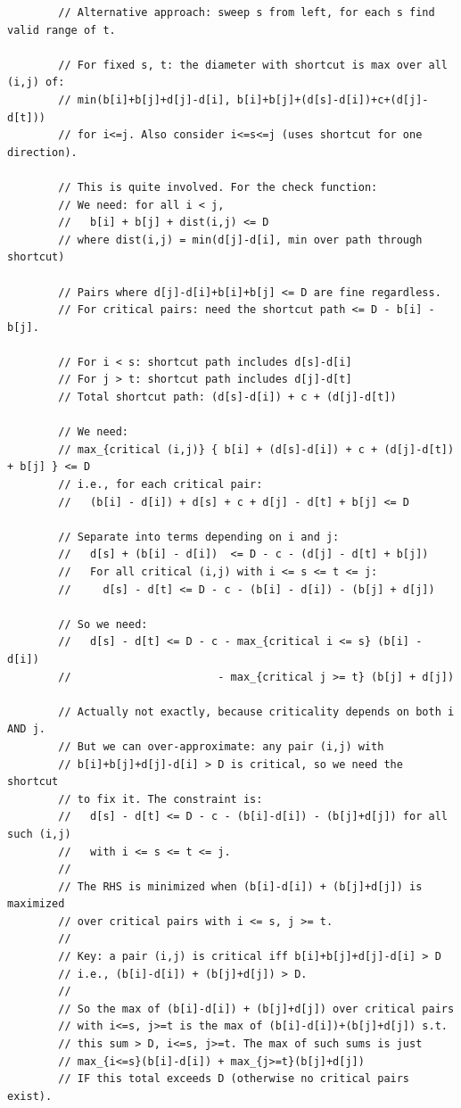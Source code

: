 \documentclass[11pt,a4paper]{article}
\begin{document}
\begin{lstlisting}
        // Alternative approach: sweep s from left, for each s find valid range of t.

        // For fixed s, t: the diameter with shortcut is max over all (i,j) of:
        // min(b[i]+b[j]+d[j]-d[i], b[i]+b[j]+(d[s]-d[i])+c+(d[j]-d[t]))
        // for i<=j. Also consider i<=s<=j (uses shortcut for one direction).

        // This is quite involved. For the check function:
        // We need: for all i < j,
        //   b[i] + b[j] + dist(i,j) <= D
        // where dist(i,j) = min(d[j]-d[i], min over path through shortcut)

        // Pairs where d[j]-d[i]+b[i]+b[j] <= D are fine regardless.
        // For critical pairs: need the shortcut path <= D - b[i] - b[j].

        // For i < s: shortcut path includes d[s]-d[i]
        // For j > t: shortcut path includes d[j]-d[t]
        // Total shortcut path: (d[s]-d[i]) + c + (d[j]-d[t])

        // We need:
        // max_{critical (i,j)} { b[i] + (d[s]-d[i]) + c + (d[j]-d[t]) + b[j] } <= D
        // i.e., for each critical pair:
        //   (b[i] - d[i]) + d[s] + c + d[j] - d[t] + b[j] <= D

        // Separate into terms depending on i and j:
        //   d[s] + (b[i] - d[i])  <= D - c - (d[j] - d[t] + b[j])
        //   For all critical (i,j) with i <= s <= t <= j:
        //     d[s] - d[t] <= D - c - (b[i] - d[i]) - (b[j] + d[j])

        // So we need:
        //   d[s] - d[t] <= D - c - max_{critical i <= s} (b[i] - d[i])
        //                       - max_{critical j >= t} (b[j] + d[j])

        // Actually not exactly, because criticality depends on both i AND j.
        // But we can over-approximate: any pair (i,j) with
        // b[i]+b[j]+d[j]-d[i] > D is critical, so we need the shortcut
        // to fix it. The constraint is:
        //   d[s] - d[t] <= D - c - (b[i]-d[i]) - (b[j]+d[j]) for all such (i,j)
        //   with i <= s <= t <= j.
        //
        // The RHS is minimized when (b[i]-d[i]) + (b[j]+d[j]) is maximized
        // over critical pairs with i <= s, j >= t.
        //
        // Key: a pair (i,j) is critical iff b[i]+b[j]+d[j]-d[i] > D
        // i.e., (b[i]-d[i]) + (b[j]+d[j]) > D.
        //
        // So the max of (b[i]-d[i]) + (b[j]+d[j]) over critical pairs
        // with i<=s, j>=t is the max of (b[i]-d[i])+(b[j]+d[j]) s.t.
        // this sum > D, i<=s, j>=t. The max of such sums is just
        // max_{i<=s}(b[i]-d[i]) + max_{j>=t}(b[j]+d[j])
        // IF this total exceeds D (otherwise no critical pairs exist).


\end{lstlisting}
\end{document}
